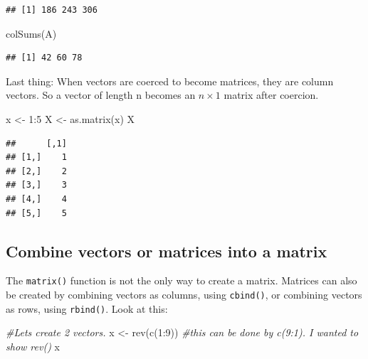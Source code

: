 \documentclass[
]{book}
\newenvironment{Shaded}{\begin{snugshade}}{\end{snugshade}}
\newcommand{\CommentTok}[1]{\textcolor[rgb]{0.56,0.35,0.01}{\textit{#1}}}
\newcommand{\DecValTok}[1]{\textcolor[rgb]{0.00,0.00,0.81}{#1}}
\newcommand{\FunctionTok}[1]{\textcolor[rgb]{0.00,0.00,0.00}{#1}}
\newcommand{\NormalTok}[1]{#1}
\newcommand{\OtherTok}[1]{\textcolor[rgb]{0.56,0.35,0.01}{#1}}
\newcommand{\SpecialCharTok}[1]{\textcolor[rgb]{0.00,0.00,0.00}{#1}}
\begin{document}
\begin{verbatim}
## [1] 186 243 306
\end{verbatim}

\begin{Shaded}
\begin{Highlighting}[]
\FunctionTok{colSums}\NormalTok{(A)}
\end{Highlighting}
\end{Shaded}

\begin{verbatim}
## [1] 42 60 78
\end{verbatim}

Last thing: When vectors are coerced to become matrices, they are column vectors. So a vector of length n becomes an \(n \times 1\) matrix after coercion.

\begin{Shaded}
\begin{Highlighting}[]
\NormalTok{x }\OtherTok{\textless{}{-}} \DecValTok{1}\SpecialCharTok{:}\DecValTok{5}
\NormalTok{X }\OtherTok{\textless{}{-}} \FunctionTok{as.matrix}\NormalTok{(x)}
\NormalTok{X}
\end{Highlighting}
\end{Shaded}

\begin{verbatim}
##      [,1]
## [1,]    1
## [2,]    2
## [3,]    3
## [4,]    4
## [5,]    5
\end{verbatim}

\hypertarget{combine-vectors-or-matrices-into-a-matrix}{%
\subsection{Combine vectors or matrices into a matrix}\label{combine-vectors-or-matrices-into-a-matrix}}

The \texttt{matrix()} function is not the only way to create a matrix. Matrices can also be created by combining vectors as columns, using \texttt{cbind()}, or combining vectors as rows, using \texttt{rbind()}. Look at this:

\begin{Shaded}
\begin{Highlighting}[]
\CommentTok{\#Let\textquotesingle{}s create 2 vectors.}
\NormalTok{x }\OtherTok{\textless{}{-}} \FunctionTok{rev}\NormalTok{(}\FunctionTok{c}\NormalTok{(}\DecValTok{1}\SpecialCharTok{:}\DecValTok{9}\NormalTok{))  }\CommentTok{\#this can be done by c(9:1). I wanted to show rev()}
\NormalTok{x}
\end{Highlighting}
\end{Shaded}
\end{document}

